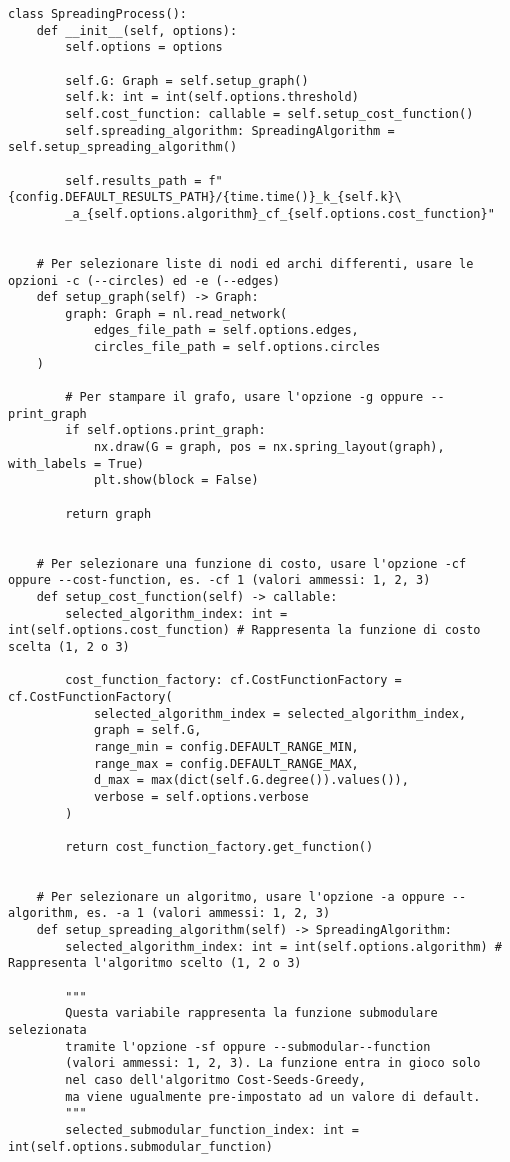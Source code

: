 \begin{code}
\begin{verbatim}
class SpreadingProcess():
    def __init__(self, options):
        self.options = options

        self.G: Graph = self.setup_graph()
        self.k: int = int(self.options.threshold)
        self.cost_function: callable = self.setup_cost_function()
        self.spreading_algorithm: SpreadingAlgorithm = self.setup_spreading_algorithm()

        self.results_path = f"{config.DEFAULT_RESULTS_PATH}/{time.time()}_k_{self.k}\
        _a_{self.options.algorithm}_cf_{self.options.cost_function}"


    # Per selezionare liste di nodi ed archi differenti, usare le opzioni -c (--circles) ed -e (--edges)
    def setup_graph(self) -> Graph:
        graph: Graph = nl.read_network(
            edges_file_path = self.options.edges,
            circles_file_path = self.options.circles
    )

        # Per stampare il grafo, usare l'opzione -g oppure --print_graph
        if self.options.print_graph:
            nx.draw(G = graph, pos = nx.spring_layout(graph), with_labels = True)
            plt.show(block = False)

        return graph


    # Per selezionare una funzione di costo, usare l'opzione -cf oppure --cost-function, es. -cf 1 (valori ammessi: 1, 2, 3)
    def setup_cost_function(self) -> callable:
        selected_algorithm_index: int = int(self.options.cost_function) # Rappresenta la funzione di costo scelta (1, 2 o 3)

        cost_function_factory: cf.CostFunctionFactory = cf.CostFunctionFactory(
            selected_algorithm_index = selected_algorithm_index,
            graph = self.G,
            range_min = config.DEFAULT_RANGE_MIN,
            range_max = config.DEFAULT_RANGE_MAX,
            d_max = max(dict(self.G.degree()).values()),
            verbose = self.options.verbose
        )
        
        return cost_function_factory.get_function()


    # Per selezionare un algoritmo, usare l'opzione -a oppure --algorithm, es. -a 1 (valori ammessi: 1, 2, 3)
    def setup_spreading_algorithm(self) -> SpreadingAlgorithm:
        selected_algorithm_index: int = int(self.options.algorithm) # Rappresenta l'algoritmo scelto (1, 2 o 3)

        """
        Questa variabile rappresenta la funzione submodulare selezionata 
        tramite l'opzione -sf oppure --submodular--function 
        (valori ammessi: 1, 2, 3). La funzione entra in gioco solo 
        nel caso dell'algoritmo Cost-Seeds-Greedy, 
        ma viene ugualmente pre-impostato ad un valore di default.
        """
        selected_submodular_function_index: int = int(self.options.submodular_function) 


\end{verbatim}
\end{code}
